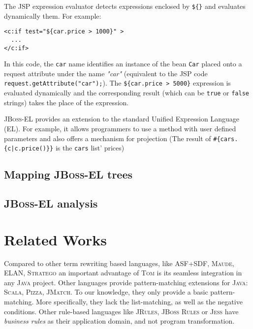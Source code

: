 \documentclass[runningheads]{llncs}
\newcommand{\scala}{\textsc{Scala}}
\newcommand{\pizza}{\textsc{Pizza}}
\newcommand{\jmatch}{\textsc{JMatch}}
\newcommand{\jbossrules}{\textsc{JBoss Rules}}
\newcommand{\jbossel}{\textsc{JBoss-EL}}
\newcommand{\jsp}{\textsc{JSP}}
\newcommand{\jess}{\textsc{Jess}}
\newcommand{\jrules}{\textsc{JRules}}
\newcommand{\stratego}{\textsc{Stratego}}
\newcommand{\maude}{\textsc{Maude}\xspace}
\newcommand{\asfsdf}{{ASF+SDF}\xspace}
\newcommand{\elan}    {\textsf{ELAN}\xspace}
\newcommand{\tom}{\textsc{Tom}}
\newcommand{\java}{\textsc{Java}}
\begin{document}
The {\jsp} expression evaluator detects expressions enclosed by \texttt{\$\{\}}
and evaluates dynamically them. For example:

\begin{verbatim}            
<c:if test="${car.price > 1000}" >
  ...
</c:if> 
\end{verbatim}            

In this code, the \texttt{car} name identifies an instance of the bean
\texttt{Car} placed onto a request attribute under the name \emph{"car"}
(equivalent to the {\jsp} code \verb+request.getAttribute("car");+). The
\verb+${car.price > 5000}+ expression is evaluated dynamically and the
corresponding result (which can be \verb+true+ or \verb+false+ strings) takes
the place of the expression.

{\jbossel} provides an extension to the standard Unified Expression Language
(EL). For example, it allows programmers to use a method with user defined
parameters and also offers a mechanism for projection (The result of
    \verb+#{cars.{c|c.price()}}+ is the \verb+cars+ list' prices) 


\subsection{Mapping {\jbossel} trees}


\subsection{{\jbossel} analysis}


\section{Related Works}

Compared to other term rewriting based languages, like {\asfsdf}, {\maude},
{\elan}, {\stratego} an important advantage of {\tom} is its seamless
integration in any {\java} project. Other languages provide pattern-matching
extensions for {\java}: {\scala}, {\pizza}, {\jmatch}. To our knowledge, they
only provide a basic pattern-matching. More specifically, they lack the
list-matching, as well as the negative conditions. Other rule-based languages
like {\jrules}, {\jbossrules} or {\jess} have \emph{business rules} as their
application domain, and not program transformation.
\end{document}
